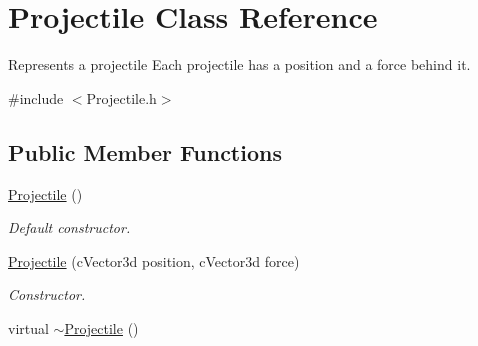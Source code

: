 \hypertarget{classProjectile}{
\section{Projectile Class Reference}
\label{classProjectile}
}


Represents a projectile Each projectile has a position and a force behind it.  




{\ttfamily \#include $<$Projectile.h$>$}

\subsection*{Public Member Functions}
\begin{DoxyCompactItemize}
\item 
\hyperlink{classProjectile_ac536ed2aad56af866a2078b9a85aa16d}{Projectile} ()
\begin{DoxyCompactList}\small\item\em Default constructor. \item\end{DoxyCompactList}\item 
\hyperlink{classProjectile_aa6b1d062ff11e1cb71941d8c4bc834ff}{Projectile} (cVector3d position, cVector3d force)
\begin{DoxyCompactList}\small\item\em Constructor. \item\end{DoxyCompactList}\item 
\hypertarget{classProjectile_a94903e021fa2edab60ba3836ca0b937d}{
virtual \hyperlink{classProjectile_a94903e021fa2edab60ba3836ca0b937d}{$\sim$Projectile} ()}
\label{classProjectile_a94903e021fa2edab60ba3836ca0b937d}


\end{DoxyCompactItemize}

